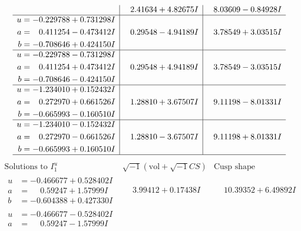 \documentclass[1p]{elsarticle_modified}
\theoremstyle{definition}
\newcommand{\I}{\sqrt{-1}}
\begin{document}
$$\begin{array}{c|c|c}
 & \phantom{-}2.41634 + 4.82675 I & \phantom{-}8.03609 - 0.84928 I \\ \hline\begin{aligned}
u &= -0.229788 + 0.731298 I \\
a &= \phantom{-}0.411254 - 0.473412 I \\
b &= -0.708646 + 0.424150 I\end{aligned}
 & \phantom{-}0.29548 - 4.94189 I & \phantom{-}3.78549 + 3.03515 I \\ \hline\begin{aligned}
u &= -0.229788 - 0.731298 I \\
a &= \phantom{-}0.411254 + 0.473412 I \\
b &= -0.708646 - 0.424150 I\end{aligned}
 & \phantom{-}0.29548 + 4.94189 I & \phantom{-}3.78549 - 3.03515 I \\ \hline\begin{aligned}
u &= -1.234010 + 0.152432 I \\
a &= \phantom{-}0.272970 + 0.661526 I \\
b &= -0.665993 - 0.160510 I\end{aligned}
 & \phantom{-}1.28810 + 3.67507 I & \phantom{-}9.11198 - 8.01331 I \\ \hline\begin{aligned}
u &= -1.234010 - 0.152432 I \\
a &= \phantom{-}0.272970 - 0.661526 I \\
b &= -0.665993 + 0.160510 I\end{aligned}
 & \phantom{-}1.28810 - 3.67507 I & \phantom{-}9.11198 + 8.01331 I\\
 \hline 
 \end{array}$$\newpage$$\begin{array}{c|c|c}  
\text{Solutions to }I^u_{1}& \I (\text{vol} + \sqrt{-1}CS) & \text{Cusp shape}\\
 \hline 
\begin{aligned}
u &= -0.466677 + 0.528402 I \\
a &= \phantom{-}0.59247 + 1.57999 I \\
b &= -0.604388 + 0.427330 I\end{aligned}
 & \phantom{-}3.99412 + 0.17438 I & \phantom{-}10.39352 + 6.49892 I \\ \hline\begin{aligned}
u &= -0.466677 - 0.528402 I \\
a &= \phantom{-}0.59247 - 1.57999 I \\

\end{aligned}
\end{array}$$
\end{document}
